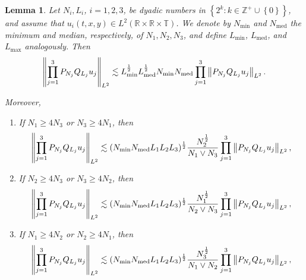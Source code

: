 \documentclass[12pt,oneside,reqno]{amsart}
\makeatletter
\numberwithin{equation}{section}
\theoremstyle{plain}
\newtheorem{lemma}[theorem]{Lemma}
\def\R{{\mathbb R}}
\def\Z{{\mathbb Z}}
\def\T{{\mathbb T}}
\newcommand{\brs}[1]{%
    \left\{#1\right\}
}
\newcommand{\rom}[1]{%
    \expandafter\@slowromancap
    \romannumeral #1@%
}
\newcommand{\Lpn}[2]{%
    \left\lVert #1\right\rVert_{L^{#2}}%
}
\newcommand{\rrt}{\R\times\R\times\T}
\newcommand{\PQ}[2]{%
    P_{N_{#2}}Q_{L_{#2}}#1_{#2}%
}
\makeatother
\begin{document}
\begin{lemma}
\label{Lem:TheTrilinearEstimateIn-L2}
Let $N_i,L_i$, $i=1,2,3$, be dyadic numbers in
$\brs{2^k:k\in\Z^+\cup\brs{0}}$, and assume that
$u_i(t,x,y)\in L^2(\rrt)$. We denote by $N_{\min}$ and $N_{\mathrm{med}}$ the
minimum and median, respectively, of $N_1,N_2,N_3$, and define
$L_{\min}$, $L_{\mathrm{med}}$, and $L_{\max}$ analogously. Then
\begin{equation}
\label{TheTrivialTrilinearEstimateIn-L2}
    \Lpn{\prod_{j=1}^3 {\PQ{u}{j}}}{2} \lesssim L_{\min}^\frac{1}{2} L_{\mathrm{med}}^\frac{1}{2} N_{\min} N_{\mathrm{med}} \prod_{j=1}^3 \Lpn{\PQ{u}{j}}{2}.
\end{equation}


Moreover, 


\begin{enumerate}
\item[(\rom{1})] If $N_1 \geq 4 N_3$ or $N_3 \geq 4 N_1$, then
    \begin{equation}
    \label{eq:trilinear-L2-N1-N3}
\Lpn{\prod_{j=1}^3 {\PQ{u}{j}}}{2} \lesssim (N_{\min}N_{\mathrm{med}}L_1L_2L_3)^\frac{1}{2} \frac{N_2^\frac{1}{2}}{N_1 \lor N_3} \prod_{j=1}^3 \Lpn{\PQ{u}{j}}{2},
\end{equation}




\item[(\rom{2})] If $N_2 \geq 4 N_3$ or $N_3 \geq 4 N_2$, then 
 \begin{equation}
    \label{eq:trilinear-L2-N2-N3}
\Lpn{\prod_{j=1}^3 {\PQ{u}{j}}}{2} \lesssim (N_{\min}N_{\mathrm{med}}L_1L_2L_3)^\frac{1}{2} \frac{N_1^\frac{1}{2}}{N_2 \lor N_3} \prod_{j=1}^3 \Lpn{\PQ{u}{j}}{2},
\end{equation}

\item[(\rom{3})] If $N_1 \geq 4 N_2$ or $N_2 \geq 4 N_1$, then 
 \begin{equation}
    \label{eq:trilinear-L2-N1-N2}
\Lpn{\prod_{j=1}^3 {\PQ{u}{j}}}{2} \lesssim (N_{\min}N_{\mathrm{med}}L_1L_2L_3)^\frac{1}{2} \frac{N_3^\frac{1}{2}}{N_1 \lor N_2} \prod_{j=1}^3 \Lpn{\PQ{u}{j}}{2},
\end{equation}
    
\end{enumerate}

\end{lemma}
\end{document}
